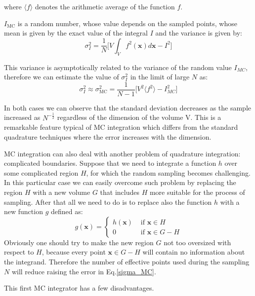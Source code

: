 \documentclass[../main/main.tex]{subfiles}
\begin{document}
where $\langle f \rangle$ denotes the arithmetic average of the function $f$.

$I_{\text{MC}}$ is a random number, whose value depends on the sampled points, whose mean 
is given by the exact value of the integral $I$ and the variance is given by:
\begin{equation}
	\label{variance}
	\sigma^2_I = \frac{1}{N} \big[ V \int_{V}   f^2(\textbf{x}) d \textbf{x}  - I^2 \big]
\end{equation}

This variance is asymptotically related to the variance of the random value $I_{MC}$, therefore
we can estimate the value of $\sigma^2_I$ in the limit of large $N$ as:
\begin{equation}
	\label{sigma_MC}
	\sigma^2_I \approx \sigma^2_\text{MC}  = \frac{1}{N-1} \Big[ 
	V^2 \langle  f^2 \rangle 
	- I^2_{MC}\Big]
\end{equation}

In both cases we can observe that the standard deviation decreases as the sample increased 
as $N^{-\frac{1}{2}}$ regardless of the dimension of the volume V. This is a remarkable feature 
typical of MC integration which differs from the standard quadrature techniques where the error 
increases with the dimension.

MC integration can also deal with another problem of quadrature integration: complicated boundaries.
Suppose that we need to integrate a function $h$ over some complicated region $H$, for which the 
random sampling becomes challenging. 
In this particular case we can easily overcome such problem by replacing the region $H$ with a new volume 
$G$ that includes $H$ more suitable for the process of sampling. After that all we need to do is to replace also 
the function $h$ with a new function $g$ defined as:
\begin{equation}
	g(\textbf{x}) = \begin{cases}
		h(\textbf{x}) &\text{ if $\textbf{x} \in H$} \\
		0 &\text{ if $\textbf{x} \in G - H$}
	\end{cases}
\end{equation}
Obviously one should try to make the new region $G$ not too oversized with respect to $H$, because every 
point $\textbf{x} \in G - H$ will contain no information about the integrand. Therefore the number of 
effective points used during the sampling $N$ will reduce raising the error in Eq.\eqref{sigma_MC}.

This first MC integrator has a few disadvantages.
\end{document}
